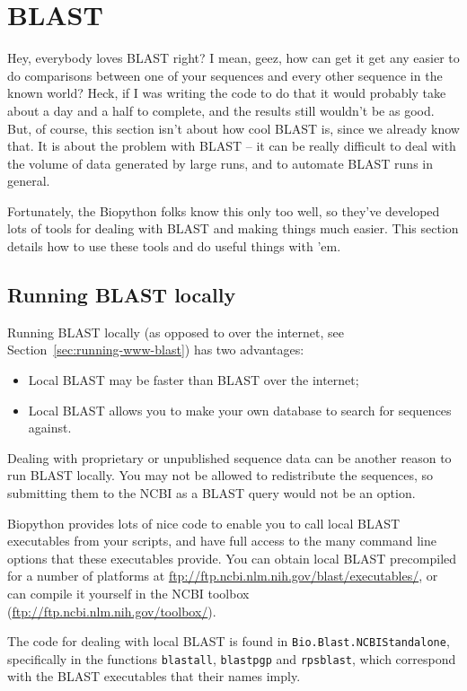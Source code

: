 \documentclass{report}
\begin{document}
\chapter{BLAST}
\label{sec:blast}

Hey, everybody loves BLAST right? I mean, geez, how can get it get any easier to do comparisons between one of your sequences and every other sequence in the known world? Heck, if I was writing the code to do that it would probably take about a day and a half to complete, and the results still wouldn't be as good. But, of course, this section isn't about how cool BLAST is, since we already know that. It is about the problem with BLAST -- it can be really difficult to deal with the volume of data generated by large runs, and to automate BLAST runs in general.


Fortunately, the Biopython folks know this only too well, so they've developed lots of tools for dealing with BLAST and making things much easier. This section details how to use these tools and do useful things with 'em. 

\section{Running BLAST locally}
\label{sec:running-local-blast}

Running BLAST locally (as opposed to over the internet, see
Section~\ref{sec:running-www-blast}) has two advantages:
\begin{itemize}
\item Local BLAST may be faster than BLAST over the internet;
\item Local BLAST allows you to make your own database to search for sequences against.
\end{itemize}
Dealing with proprietary or unpublished sequence data can be another reason to run BLAST locally.  You may not be allowed to redistribute the sequences, so submitting them to the NCBI as a BLAST query would not be an option. 

Biopython provides lots of nice code to enable you to call local BLAST executables from your scripts, and have full access to the many command line options that these executables provide. You can obtain local BLAST precompiled for a number of platforms at \url{ftp://ftp.ncbi.nlm.nih.gov/blast/executables/}, or can compile it yourself in the NCBI toolbox (\url{ftp://ftp.ncbi.nlm.nih.gov/toolbox/}).

The code for dealing with local BLAST is found in \verb|Bio.Blast.NCBIStandalone|, specifically in the functions \verb|blastall|, \verb|blastpgp| and \verb|rpsblast|, which correspond with the BLAST executables that their names imply.
\end{document}
